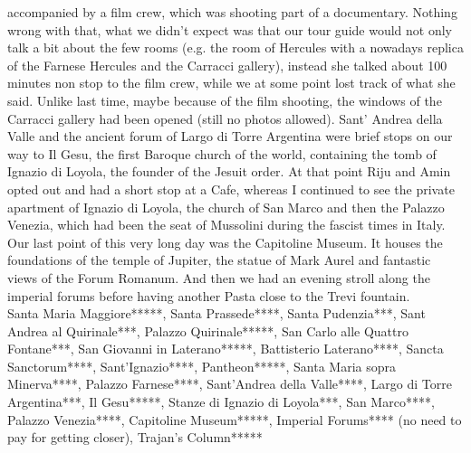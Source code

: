 accompanied by a film crew, which was shooting part of a documentary. Nothing wrong with that, what we didn't expect was that our tour guide would not only talk a bit about the few rooms (e.g. the room of Hercules with a nowadays replica of the Farnese Hercules and the Carracci gallery), instead she talked about 100 minutes non stop to the film crew, while we at some point lost track of what she said. Unlike last time, maybe because of the film shooting, the windows of the Carracci gallery had been opened (still no photos allowed). Sant' Andrea della Valle and the ancient forum of Largo di Torre Argentina were brief stops on our way to Il Gesu, the first Baroque church of the world, containing the tomb of Ignazio di Loyola, the founder of the Jesuit order. At that point Riju and Amin opted out and had a short stop at a Cafe, whereas I continued to see the private apartment of Ignazio di Loyola, the church of San Marco and then the Palazzo Venezia, which had been the seat of Mussolini during the fascist times in Italy. Our last point of this very long day was the Capitoline Museum. It houses the foundations of the temple of Jupiter, the statue of Mark Aurel and fantastic views of the Forum Romanum. And then we had an evening stroll along the imperial forums before having another Pasta close to the Trevi fountain. \\

Santa Maria Maggiore*****, Santa Prassede****, Santa Pudenzia***, Sant Andrea al Quirinale***,  Palazzo Quirinale*****, San Carlo alle Quattro Fontane***,  San Giovanni in Laterano*****,  Battisterio Laterano****, Sancta Sanctorum****,  Sant'Ignazio****,  Pantheon*****,  Santa Maria sopra Minerva****,  Palazzo Farnese****,  Sant'Andrea della Valle****,  Largo di Torre Argentina***, Il Gesu*****,  Stanze di Ignazio di Loyola***,  San Marco****,  Palazzo Venezia****,  Capitoline Museum*****, Imperial Forums**** (no need to pay for getting closer),  Trajan's Column*****\\


